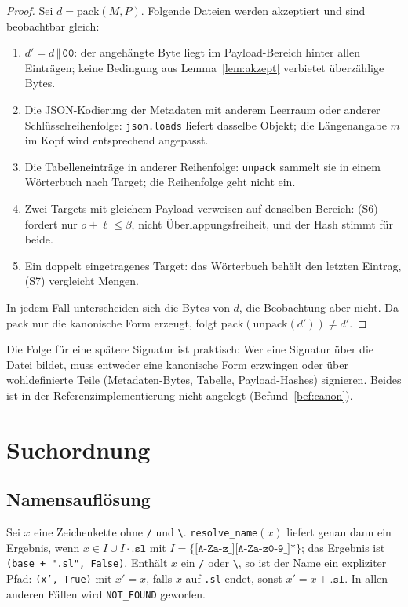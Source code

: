 \begin{proof}
	Sei $d=\mathrm{pack}(M,P)$. Folgende Dateien werden akzeptiert und sind beobachtbar gleich:
	\begin{enumerate}[label=(\alph*)]
		\item $d'=d\,\Vert\,\texttt{00}$: der angehängte Byte liegt im Payload-Bereich hinter allen Einträgen; keine Bedingung aus Lemma~\ref{lem:akzept} verbietet überzählige Bytes.
		\item Die JSON-Kodierung der Metadaten mit anderem Leerraum oder anderer Schlüsselreihenfolge: \texttt{json.loads} liefert dasselbe Objekt; die Längenangabe $m$ im Kopf wird entsprechend angepasst.
		\item Die Tabelleneinträge in anderer Reihenfolge: \texttt{unpack} sammelt sie in einem Wörterbuch nach Target; die Reihenfolge geht nicht ein.
		\item Zwei Targets mit gleichem Payload verweisen auf denselben Bereich: (S6) fordert nur $o+\ell\le\beta$, nicht Überlappungsfreiheit, und der Hash stimmt für beide.
		\item Ein doppelt eingetragenes Target: das Wörterbuch behält den letzten Eintrag, (S7) vergleicht Mengen.
	\end{enumerate}
	In jedem Fall unterscheiden sich die Bytes von $d$, die Beobachtung aber nicht. Da $\mathrm{pack}$ nur die kanonische Form erzeugt, folgt $\mathrm{pack}(\mathrm{unpack}(d'))\ne d'$.
\end{proof}

Die Folge für eine spätere Signatur ist praktisch: Wer eine Signatur über die Datei bildet, muss entweder eine kanonische Form erzwingen oder über wohldefinierte Teile (Metadaten-Bytes, Tabelle, Payload-Hashes) signieren. Beides ist in der Referenzimplementierung nicht angelegt (Befund~\ref{bef:canon}).

\chapter{Suchordnung}
\label{chap:suche}

\section{Namensauflösung}

\begin{lemma}
	\label{lem:name}
	Sei $x$ eine Zeichenkette ohne \texttt{/} und \texttt{\textbackslash}. \texttt{resolve\_name}$(x)$ liefert genau dann ein Ergebnis, wenn $x\in I\cup I\cdot\texttt{.sl}$ mit $I=\{\texttt{[A-Za-z\_][A-Za-z0-9\_]*}\}$; das Ergebnis ist \texttt{(base + ".sl", False)}. Enthält $x$ ein \texttt{/} oder \texttt{\textbackslash}, so ist der Name ein expliziter Pfad: \texttt{(x', True)} mit $x'=x$, falls $x$ auf \texttt{.sl} endet, sonst $x'=x+\texttt{.sl}$. In allen anderen Fällen wird \texttt{NOT\_FOUND} geworfen.
\end{lemma}

